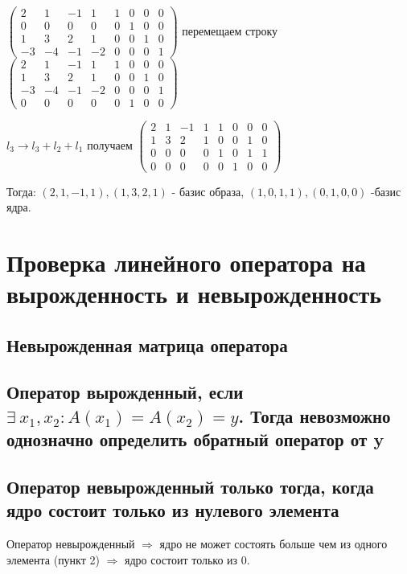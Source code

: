 \documentclass[12pt]{article}
\begin{document}
$\left(\begin{array}{cccc|cccc}
            2  & 1  & -1 & 1  & 1 & 0 & 0 & 0 \\
            0  & 0  & 0  & 0  & 0 & 1 & 0 & 0 \\
            1  & 3  & 2  & 1  & 0 & 0 & 1 & 0 \\
            -3 & -4 & -1 & -2 & 0 & 0 & 0 & 1
        \end{array} \right)$ перемещаем строку $\left(\begin{array}{cccc|cccc}
            2  & 1  & -1 & 1  & 1 & 0 & 0 & 0 \\
            1  & 3  & 2  & 1  & 0 & 0 & 1 & 0 \\
            -3 & -4 & -1 & -2 & 0 & 0 & 0 & 1 \\
            0  & 0  & 0  & 0  & 0 & 1 & 0 & 0
        \end{array} \right)$

$l_3 \rightarrow l_3 + l_2 + l_1$ получаем $\left(\begin{array}{cccc|cccc}
            2 & 1 & -1 & 1 & 1 & 0 & 0 & 0 \\
            1 & 3 & 2  & 1 & 0 & 0 & 1 & 0 \\
            0 & 0 & 0  & 0 & 1 & 0 & 1 & 1 \\
            0 & 0 & 0  & 0 & 0 & 1 & 0 & 0
        \end{array} \right)$

Тогда: $(2,1,-1,1), (1,3,2,1)$ - базис образа, $(1,0,1,1),(0,1,0,0)$ -базис ядра.

\section{Проверка линейного оператора на вырожденность и невырожденность}
\subsection{Невырожденная матрица оператора}
\subsection{Оператор вырожденный, если $\exists\ x_1, x_2 : A(x_1) = A(x_2) = y$. Тогда невозможно однозначно определить обратный оператор от y}
\subsection{Оператор невырожденный только тогда, когда ядро состоит только из нулевого элемента}
Оператор невырожденный $\Rightarrow$ ядро не может состоять больше чем из одного элемента (пункт 2) $\Rightarrow$ ядро состоит только из 0.
\end{document}
